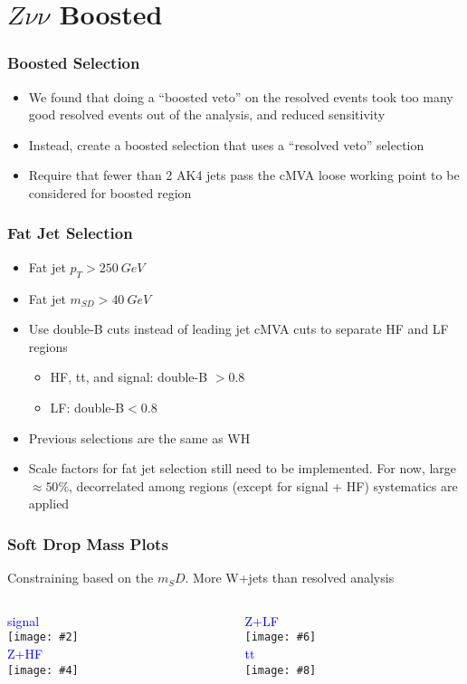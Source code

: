 \documentclass{beamer}
\newcommand{\fourfigs}[8]{
  \begin{columns}
    \begin{column}{0.3\linewidth}
      \centering
      \textcolor{blue}{#1} \\
      \texttt{[image: \#2]} \\
      \textcolor{blue}{#3} \\
      \texttt{[image: \#4]}
    \end{column}
    \begin{column}{0.3\linewidth}
      \centering
      \textcolor{blue}{#5} \\
      \texttt{[image: \#6]} \\
      \textcolor{blue}{#7} \\
      \texttt{[image: \#8]}
    \end{column}
  \end{columns}
}
\begin{document}
\section{$Z\nu\nu$ Boosted}

\begin{frame}
  \frametitle{Boosted Selection}
  \begin{itemize}
  \item We found that doing a ``boosted veto'' on the resolved events took too many
    good resolved events out of the analysis, and reduced sensitivity
  \item Instead, create a boosted selection that uses a ``resolved veto'' selection
  \item Require that fewer than 2 AK4 jets pass the cMVA loose working point to be considered
    for boosted region
  \end{itemize}
\end{frame}

\begin{frame}
  \frametitle{Fat Jet Selection}
  \begin{itemize}
  \item Fat jet $p_T > \SI{250}{GeV}$
  \item Fat jet $m_{SD} > \SI{40}{GeV}$
  \item Use double-B cuts instead of leading jet cMVA cuts to separate HF and LF regions
    \begin{itemize}
    \item HF, tt, and signal: double-B $> 0.8$
    \item LF: double-B$< 0.8$
    \end{itemize}
  \item Previous selections are the same as WH
  \item Scale factors for fat jet selection still need to be implemented.
    For now, large $\approx 50\%$, decorrelated among regions (except for signal + HF)
    systematics are applied
  \end{itemize}
\end{frame}

\begin{frame}
  \frametitle{Soft Drop Mass Plots}
  Constraining based on the $m_SD$. More W+jets than resolved analysis

  \fourfigs{signal}
           {180327_v4/boosted_signal_fatjet1_mSD_corr}
           {Z+HF}
           {180327_v4/boosted_heavyz_fatjet1_mSD_corr}
           {Z+LF}
           {180327_v4/boosted_lightz_fatjet1_mSD_corr}
           {tt}
           {180327_v4/boosted_tt_fatjet1_mSD_corr}
\end{frame}
\end{document}
